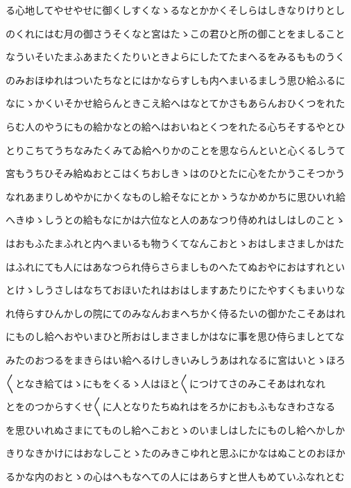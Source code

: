 \documentclass[a4paper,11pt,landscape]{ltjtarticle}
\begin{document}
\par\medskip
る心地してやせやせに御くしすくなゝるなとかかくそしらはしきなりけりとし
\par\medskip
のくれにはむ月の御さうそくなと宮はたゝこの君ひと所の御ことをましること
\par\medskip
なういそいたまふあまたくたりいときよらにしたてたまへるをみるもものうく
\par\medskip
のみおほゆれはついたちなとにはかならすしも内へまいるましう思ひ給ふるに
\par\medskip
なにゝかくいそかせ給らんときこえ給へはなとてかさもあらんおひくつをれた
\par\medskip
らむ人のやうにもの給かなとの給へはおいねとくつをれたる心ちそするやとひ
\par\medskip
とりこちてうちなみたくみてゐ給へりかのことを思ならんといと心くるしうて
\par\medskip
宮もうちひそみ給ぬおとこはくちおしきゝはのひとたに心をたかうこそつかう
\par\medskip
なれあまりしめやかにかくなものし給そなにとかゝうなかめかちに思ひいれ給
\par\medskip
へきゆゝしうとの給もなにかは六位なと人のあなつり侍めれはしはしのことゝ
\par\medskip
はおもふたまふれと内へまいるも物うくてなんこおとゝおはしまさましかはた
\par\medskip
はふれにても人にはあなつられ侍らさらましものへたてぬおやにおはすれとい
\par\medskip
とけゝしうさしはなちておほいたれはおはしますあたりにたやすくもまいりな
\par\medskip
れ侍らすひんかしの院にてのみなんおまへちかく侍るたいの御かたこそあはれ
\par\medskip
にものし給へおやいまひと所おはしまさましかはなに事を思ひ侍らましとてな
\par\medskip
みたのおつるをまきらはい給へるけしきいみしうあはれなるに宮はいとゝほろ
\par\medskip
〱となき給てはゝにもをくるゝ人はほと〱につけてさのみこそあはれなれ
\par\medskip
とをのつからすくせ〱に人となりたちぬれはをろかにおもふもなきわさなる
\par\medskip
を思ひいれぬさまにてものし給へこおとゝのいましはしたにものし給へかしか
\par\medskip
きりなきかけにはおなしことゝたのみきこゆれと思ふにかなはぬことのおほか
\par\medskip
るかな内のおとゝの心はへもなへての人にはあらすと世人もめていふなれとむ
\par\medskip
\end{document}
